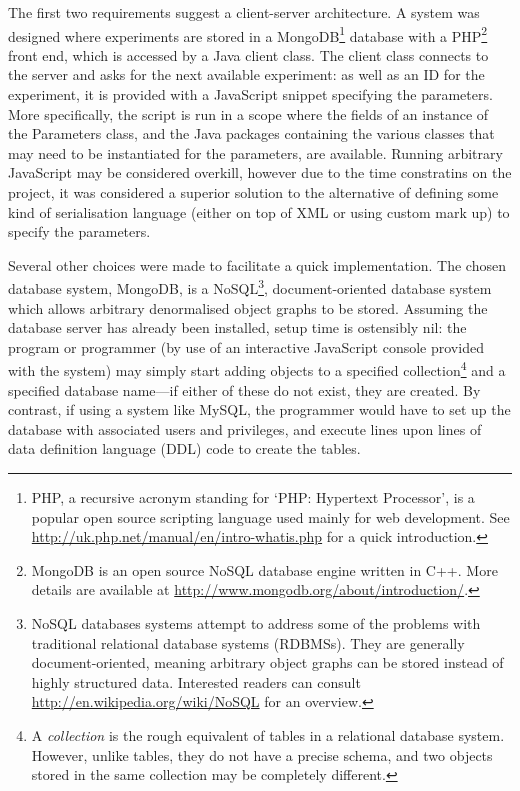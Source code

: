 
The first two requirements suggest a client-server architecture.  A system was designed where experiments are stored in a MongoDB\footnote{PHP, a recursive acronym standing for `PHP: Hypertext Processor', is a popular open source scripting language used mainly for web development.  See \url{http://uk.php.net/manual/en/intro-whatis.php} for a quick introduction.} database with a PHP\footnote{MongoDB is an open source NoSQL database engine written in C++.  More details are available at \url{http://www.mongodb.org/about/introduction/}.} front end, which is accessed by a Java client class.  The client class connects to the server and asks for the next available experiment: as well as an ID for the experiment, it is provided with a JavaScript snippet specifying the parameters.  More specifically, the script is run in a scope where the fields of an instance of the Parameters class, and the Java packages containing the various classes that may need to be instantiated for the parameters, are available.  Running arbitrary JavaScript may be considered overkill, however due to the time constratins on the project, it was considered a superior solution to the alternative of defining some kind of serialisation language (either on top of XML or using custom mark up) to specify the parameters.

Several other choices were made to facilitate a quick implementation.  The chosen database system, MongoDB, is a NoSQL\footnote{NoSQL databases systems attempt to address some of the problems with traditional relational database systems (RDBMSs).  They are generally document-oriented, meaning arbitrary object graphs can be stored instead of highly structured data.  Interested readers can consult \url{http://en.wikipedia.org/wiki/NoSQL} for an overview.}, document-oriented database system which allows arbitrary denormalised object graphs to be stored.  Assuming the database server has already been installed, setup time is ostensibly nil: the program or programmer (by use of an interactive JavaScript console provided with the system) may simply start adding objects to a specified collection\footnote{A \emph{collection} is the rough equivalent of tables in a relational database system.  However, unlike tables, they do not have a precise schema, and two objects stored in the same collection may be completely different.} and a specified database name---if either of these do not exist, they are created.  By contrast, if using a system like MySQL, the programmer would have to set up the database with associated users and privileges, and execute lines upon lines of data definition language (DDL) code to create the tables.

